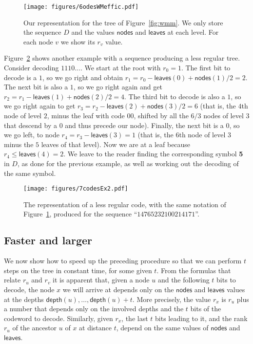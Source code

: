 \documentclass[preprint,12pt]{elsarticle}
\newcommand{\depth}{\ensuremath{\mathsf{depth}}}
\newcommand{\nodes}{\ensuremath{\mathsf{nodes}}}
\newcommand{\leaves}{\ensuremath{\mathsf{leaves}}}
\begin{document}
\begin{figure}[t]
\begin{center}
\texttt{[image: figures/6odesWMeffic.pdf]}
\end{center}
\vspace*{-5mm}
\caption{Our representation for the tree of Figure~\ref{fig:wmm}. We only
store the sequence $D$ and the values $\nodes$ and $\leaves$ at each level.
For each node $v$ we show its $r_v$ value.}
\label{fig:wmmeffic}
\end{figure}

Figure~\ref{fig:wmmeffic2} shows another example with a sequence producing
a less regular tree.
Consider decoding $1110...$. We start at the root with $r_0=1$.
The first bit to decode is a $1$, so we go right and obtain 
$r_1 = r_0-\leaves(0)+\nodes(1)/2 = 2$. The next bit is also
a $1$, so we go right again and get $r_2 = r_1 - \leaves(1)+
\nodes(2)/2 = 4$. The third bit to decode is also a $1$, so we 
go right again to get $r_3 = r_2 - \leaves(2)+ \nodes(3)/2 = 6$ 
(that is, the $4$th node of level $2$, minus the leaf with code $00$,
shifted by all the $6/3$ nodes of level $3$ that descend by a $0$ 
and thus precede our node). Finally, the next bit is a $0$, so we
go left, to node $r_4 = r_3 - \leaves(3) = 1$ (that is, the $6$th 
node of level $3$ minus the $5$ leaves of that level). Now we are 
at a leaf because $r_4 \le \leaves(4)=2$. We leave to the reader 
finding the corresponding symbol {\bf 5} in $D$, as done for the
previous example, as well as working out the decoding of the same 
symbol.

\begin{figure}[t]
\begin{center}
\texttt{[image: figures/7codesEx2.pdf]}
\end{center}
\vspace*{-5mm}
\caption{The representation of a less regular code, with the same notation
of Figure~\ref{fig:wmmeffic}, produced for the sequence ``$14765232100214171$''.}
\label{fig:wmmeffic2}
\end{figure}

\subsection{Faster and larger}

We now show how to speed up the preceding procedure so that we 
can perform $t$ steps on the tree in constant time, for some given $t$.
From the formulas that relate $r_u$ and $r_v$ it is apparent that, given a node
$u$ and the following $t$ bits to decode, the node $x$ we will arrive at 
depends only on the $\nodes$ and $\leaves$ values at the depths
$\depth(u),\ldots,\depth(u)+t$. More precisely, the value $r_x$ 
is $r_u$ plus a number that depends only on the involved 
depths and the $t$ bits of the codeword to decode. Similarly, given $r_x$,
the last $t$ bits leading to it, and the rank $r_u$ of the ancestor $u$ of
$x$ at distance $t$, depend on the same values of $\nodes$ and $\leaves$.
\end{document}
